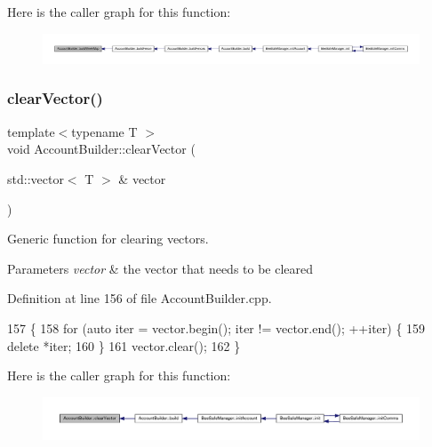 Here is the caller graph for this function\+:
\nopagebreak
\begin{figure}[H]
\begin{center}
\leavevmode
\includegraphics[width=350pt]{d9/daa/class_account_builder_a19b2e3e2c3bbf986f51c0ec53b7dc2a4_icgraph}
\end{center}
\end{figure}
\mbox{\label{class_account_builder_aad3332b566e26b4b92215bf6500b26b6}} 
\subsubsection{\texorpdfstring{clear\+Vector()}{clearVector()}}
{\footnotesize\ttfamily template$<$typename T $>$ \\
void Account\+Builder\+::clear\+Vector (\begin{DoxyParamCaption}\item[{std\+::vector$<$ T $>$ \&}]{vector }\end{DoxyParamCaption})\hspace{0.3cm}{\ttfamily [private]}}

Generic function for clearing vectors.


\begin{DoxyParams}{Parameters}
{\em vector} & the vector that needs to be cleared \\
\hline
\end{DoxyParams}


Definition at line 156 of file Account\+Builder.\+cpp.


\begin{DoxyCode}
157 \{
158     \textcolor{keywordflow}{for} (\textcolor{keyword}{auto} iter = vector.begin(); iter != vector.end(); ++iter) \{
159         \textcolor{keyword}{delete} *iter;
160     \}
161     vector.clear();
162 \}
\end{DoxyCode}
Here is the caller graph for this function\+:
\nopagebreak
\begin{figure}[H]
\begin{center}
\leavevmode
\includegraphics[width=350pt]{d9/daa/class_account_builder_aad3332b566e26b4b92215bf6500b26b6_icgraph}
\end{center}
\end{figure}
\mbox{\label{class_account_builder_a6161184b277a8055ccab47411b14d195}} 
